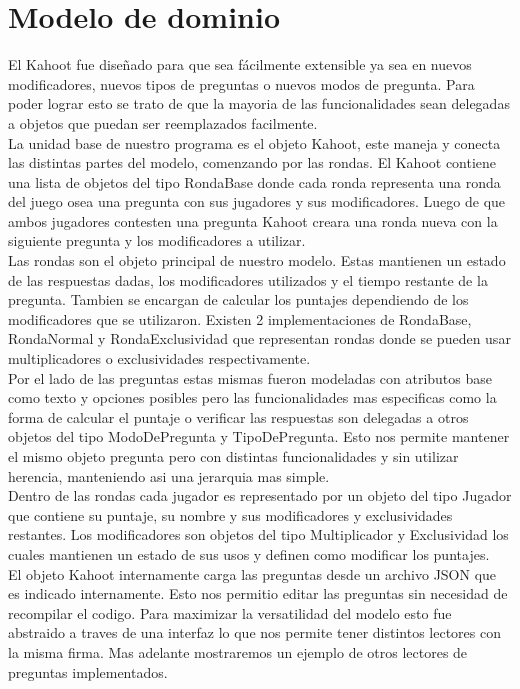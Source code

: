 \documentclass[titlepage,a4paper]{article}
\begin{document}
\section{Modelo de dominio}\label{sec:modelo}
El Kahoot fue diseñado para que sea fácilmente extensible ya sea en nuevos modificadores, nuevos tipos de preguntas o nuevos modos de pregunta. Para poder lograr esto se trato de que la mayoria de las funcionalidades sean delegadas a objetos que puedan ser reemplazados facilmente. \\

La unidad base de nuestro programa es el objeto Kahoot, este maneja y conecta las distintas partes del modelo, comenzando por las rondas. El Kahoot contiene una lista de objetos del tipo RondaBase donde cada ronda representa una ronda del juego osea una pregunta con sus jugadores y sus modificadores. Luego de que ambos jugadores contesten una pregunta Kahoot creara una ronda nueva con la siguiente pregunta y los modificadores a utilizar.\\

Las rondas son el objeto principal de nuestro modelo. Estas mantienen un estado de las respuestas dadas, los modificadores utilizados y el tiempo restante de la pregunta. Tambien se encargan de calcular los puntajes dependiendo de los modificadores que se utilizaron. Existen 2 implementaciones de RondaBase, RondaNormal y RondaExclusividad que representan rondas donde se pueden usar multiplicadores o exclusividades respectivamente.\\

Por el lado de las preguntas estas mismas fueron modeladas con atributos base como texto y opciones posibles pero las funcionalidades mas especificas como la forma de calcular el puntaje o verificar las respuestas son delegadas a otros objetos del tipo ModoDePregunta y TipoDePregunta. Esto nos permite mantener el mismo objeto pregunta pero con distintas funcionalidades y sin utilizar herencia, manteniendo asi una jerarquia mas simple.\\

Dentro de las rondas cada jugador es representado por un objeto del tipo Jugador que contiene su puntaje, su nombre y sus modificadores y exclusividades restantes. Los modificadores son objetos del tipo Multiplicador y Exclusividad los cuales mantienen un estado de sus usos y definen como modificar los puntajes.\\

El objeto Kahoot internamente carga las preguntas desde un archivo JSON que es indicado internamente. Esto nos permitio editar las preguntas sin necesidad de recompilar el codigo. Para maximizar la versatilidad del modelo esto fue abstraido a traves de una interfaz lo que nos permite tener distintos lectores con la misma firma. Mas adelante mostraremos un ejemplo de otros lectores de preguntas implementados.\\
\end{document}
